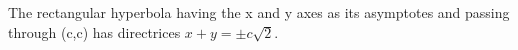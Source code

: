  The rectangular hyperbola having the x and y axes as its asymptotes and
passing through (c,c) has directrices $ x + y = \pm c \sqrt{2} . $
